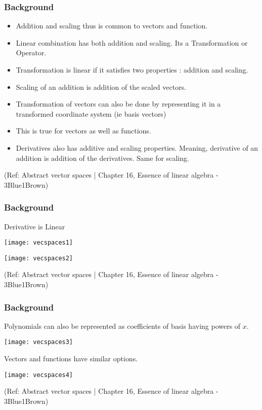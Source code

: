 \begin{frame}[fragile]
\frametitle{Background}
\begin{itemize}
\item Addition and scaling thus is common to vectors and function.
\item Linear combination has both addition and scaling. Its a Transformation or Operator.
\item Transformation is linear if it satisfies two properties : addition and scaling.
\item Scaling of an addition is addition of the scaled vectors.
\item Transformation of vectors can also be done by representing it in a transformed coordinate system (ie basis vectors)
\item This is true for vectors as well as functions.
\item Derivatives also has additive and scaling properties. Meaning, derivative of an addition is addition of the derivatives. Same for scaling.
\end{itemize}

\tiny{(Ref: Abstract vector spaces | Chapter 16, Essence of linear algebra - 3Blue1Brown)}

\end{frame}

\begin{frame}[fragile]
\frametitle{Background}

Derivative is Linear

\begin{center}
\texttt{[image: vecspaces1]}

\texttt{[image: vecspaces2]}
\end{center}


\tiny{(Ref: Abstract vector spaces | Chapter 16, Essence of linear algebra - 3Blue1Brown)}

\end{frame}

\begin{frame}[fragile]
\frametitle{Background}

Polynomials can also be represented as coefficients of basis having powers of $x$.

\begin{center}
\texttt{[image: vecspaces3]}
\end{center}

Vectors and functions have similar options.

\begin{center}
\texttt{[image: vecspaces4]}
\end{center}

\tiny{(Ref: Abstract vector spaces | Chapter 16, Essence of linear algebra - 3Blue1Brown)}

\end{frame}

